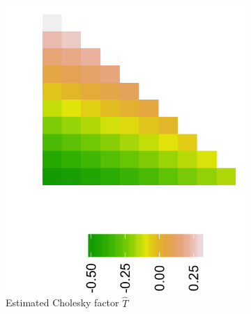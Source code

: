 \begin{figure}[H]
 \begin{subfigure}{.33\textwidth}
  \centering
  \includegraphics[width = \textwidth]{img/chapter-5/cattle-cholesky-estimate-ggplot}
 \caption{Estimated Cholesky factor $\hat{T}$}
 \end{subfigure}
 \begin{subfigure}{.33\textwidth}
  \centering

\end{subfigure}
\end{figure}
